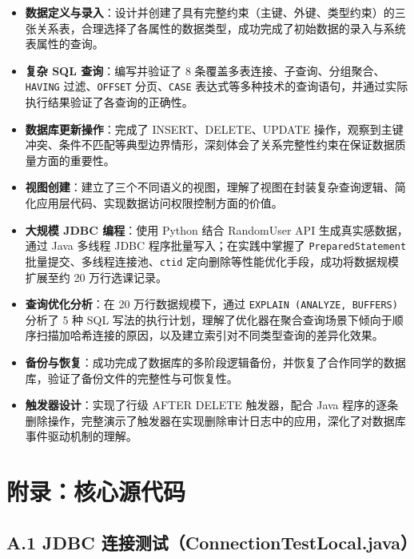 \documentclass[12pt,a4paper]{ctexart}
\begin{document}
\begin{itemize}
  \item \textbf{数据定义与录入}：设计并创建了具有完整约束（主键、外键、类型约束）的三张关系表，合理选择了各属性的数据类型，成功完成了初始数据的录入与系统表属性的查询。

  \item \textbf{复杂 SQL 查询}：编写并验证了 8 条覆盖多表连接、子查询、分组聚合、\texttt{HAVING} 过滤、\texttt{OFFSET} 分页、\texttt{CASE} 表达式等多种技术的查询语句，并通过实际执行结果验证了各查询的正确性。

  \item \textbf{数据库更新操作}：完成了 INSERT、DELETE、UPDATE 操作，观察到主键冲突、条件不匹配等典型边界情形，深刻体会了关系完整性约束在保证数据质量方面的重要性。

  \item \textbf{视图创建}：建立了三个不同语义的视图，理解了视图在封装复杂查询逻辑、简化应用层代码、实现数据访问权限控制方面的价值。

  \item \textbf{大规模 JDBC 编程}：使用 Python 结合 RandomUser API 生成真实感数据，通过 Java 多线程 JDBC 程序批量写入；在实践中掌握了 \texttt{PreparedStatement} 批量提交、多线程连接池、\texttt{ctid} 定向删除等性能优化手段，成功将数据规模扩展至约 20 万行选课记录。

  \item \textbf{查询优化分析}：在 20 万行数据规模下，通过 \texttt{EXPLAIN (ANALYZE, BUFFERS)} 分析了 5 种 SQL 写法的执行计划，理解了优化器在聚合查询场景下倾向于顺序扫描加哈希连接的原因，以及建立索引对不同类型查询的差异化效果。

  \item \textbf{备份与恢复}：成功完成了数据库的多阶段逻辑备份，并恢复了合作同学的数据库，验证了备份文件的完整性与可恢复性。

  \item \textbf{触发器设计}：实现了行级 AFTER DELETE 触发器，配合 Java 程序的逐条删除操作，完整演示了触发器在实现删除审计日志中的应用，深化了对数据库事件驱动机制的理解。
\end{itemize}

\section*{附录：核心源代码}

\subsection*{A.1 JDBC 连接测试（ConnectionTestLocal.java）}
\end{document}
